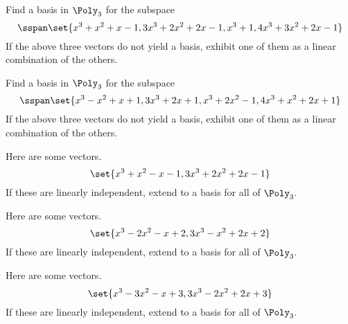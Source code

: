 \begin{ex} Find a basis in $\Poly_{3}$ for the subspace
\begin{equation*}
\sspan\set{
x^{3}+x^{2}+x-1,3x^{3}+2x^{2}+2x-1,x^{3}+1,4x^{3}+3x^{2}+2x-1}
\end{equation*}
If the above three vectors do not yield a basis, exhibit one
of them as a linear combination of the others.
\end{ex}

\begin{ex} Find a basis in $\Poly_{3}$ for the subspace
\begin{equation*}
\sspan\set{
x^{3}-x^{2}+x+1,3x^{3}+2x+1,x^{3}+2x^{2}-1,4x^{3}+x^{2}+2x+1}
\end{equation*}
If the above three vectors do not yield a basis, exhibit one
of them as a linear combination of the others.
\end{ex}

\begin{ex} Here are some vectors.
\begin{equation*}
\set{x^{3}+x^{2}-x-1,3x^{3}+2x^{2}+2x-1}
\end{equation*}
If these are linearly independent, extend to a basis for all of $\Poly_{3}$.
\end{ex}

\begin{ex} Here are some vectors.
\begin{equation*}
\set{x^{3}-2x^{2}-x+2,3x^{3}-x^{2}+2x+2}
\end{equation*}
If these are linearly independent, extend to a basis for all of $\Poly_{3}$.
\end{ex}

\begin{ex} Here are some vectors.
\begin{equation*}
\set{x^{3}-3x^{2}-x+3,3x^{3}-2x^{2}+2x+3}
\end{equation*}
If these are linearly independent, extend to a basis for all of $\Poly_{3}$.
\end{ex}

